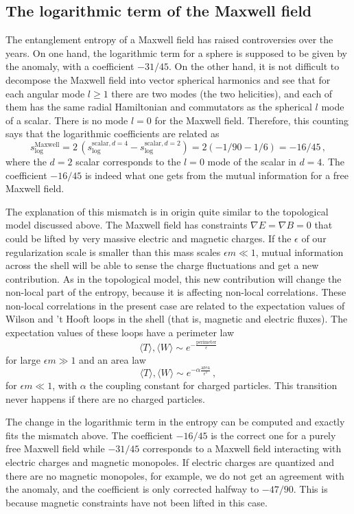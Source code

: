 \documentclass[12pt]{article}
\numberwithin{equation}{section}
\newcommand{\be}{\begin{equation}}
\newcommand{\ee}{\end{equation}}
\begin{document}
\subsection{The logarithmic term of the Maxwell field}

The entanglement entropy of a Maxwell field has raised controversies over the years.  
On one hand, the logarithmic term for a sphere is supposed to be given by the anomaly, with a coefficient $-31/45$. On the other hand, it is not difficult to decompose the  Maxwell field into vector spherical harmonics and see that for each angular mode $l\ge 1$ there are two modes (the two helicities), and each of them has the same radial Hamiltonian and commutators as the spherical $l$ mode of a scalar. There is no mode $l=0$ for the Maxwell field.  Therefore, this counting says that the logarithmic coefficients are related as 
\be
s^{\textrm{Maxwell}}_{\textrm{log}}=2\,(s^{\textrm{scalar}, d=4}_{\textrm{log}}- s^{\textrm{scalar}, d=2}_{\textrm{log}})=2(-1/90-1/6)=-16/45\,,   
\ee
where the $d=2$ scalar corresponds to the $l=0$ mode of the scalar in $d=4$. 
The coefficient $-16/45$ is indeed what one gets from the mutual information for a free Maxwell field.

The explanation of this mismatch is in origin quite similar to the topological model discussed above. The Maxwell field has constraints $\nabla E=\nabla B=0$ that could be lifted by very massive electric and magnetic charges. If the $\epsilon$ of our regularization scale is smaller than this mass scales $\epsilon m\ll 1$, mutual information across the shell will be able to sense the charge fluctuations and get a new contribution. As in the topological model, this new contribution will change the non-local part of the entropy, because it is affecting non-local correlations. These non-local correlations in the present case are related to the expectation values of Wilson and 't Hooft loops in the shell (that is, magnetic and electric fluxes). The expectation values of these loops have a perimeter law
\be\label{perr}
\langle T \rangle,\langle W \rangle \sim e^{-\frac{\textrm{perimeter}}{\epsilon}}
\ee  
for large $\epsilon m \gg 1$ and an area law 
\be \label{arr}
\langle T \rangle,\langle W \rangle \sim e^{-\alpha \frac{\textrm{area}}{\epsilon^2}}\,,
\ee 
for $\epsilon m \ll 1$, with $\alpha$ the coupling constant for charged particles. This transition never happens if there are no charged particles. 

The change in the logarithmic term in the entropy can be computed and exactly fits the mismatch above. The coefficient $-16/45$ is the correct one for a purely free Maxwell field while $-31/45$ corresponds to a Maxwell field interacting with electric charges and magnetic monopoles. If electric charges are quantized and there are no magnetic monopoles, for example, we do not get an agreement with the anomaly, and the coefficient is only corrected halfway to $-47/90$. This is because magnetic constraints have not been lifted in this case.  
\end{document}
